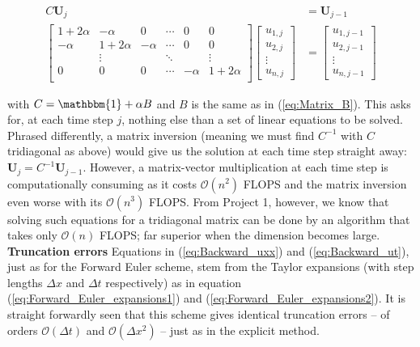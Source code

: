\documentclass[a4paper, 11pt, notitlepage,english]{article}
\newcommand{\id}{\mathbbm{1}}
\begin{document}
\begin{align}
C \boldsymbol{U}_j &= \boldsymbol{U}_{j-1} \\
\begin{bmatrix}
 1+2\alpha & -\alpha & 0 & \cdots & 0 & 0 \\
 -\alpha & 1+2\alpha & -\alpha & \cdots & 0 & 0 \\
  & \vdots & & \ddots & & \vdots \\
 0 & 0 & 0 & \cdots & -\alpha & 1+2\alpha \\
\end{bmatrix}
\begin{bmatrix}
u_{1,j} \\ u_{2,j} \\ \vdots \\ u_{n,j}
\end{bmatrix}
&=
\begin{bmatrix}
u_{1,j-1} \\ u_{2,j-1} \\ \vdots \\ u_{n,j-1}
\end{bmatrix}
\label{eq:Backwards_Euler_matrix}
\end{align}

with $C = \id + \alpha B$ and $B$ is the same as in (\ref{eq:Matrix_B}). This asks for, at each time step $j$, nothing else than a set of linear equations to be solved. Phrased differently, a matrix inversion (meaning we must find $C^{-1}$ with $C$ tridiagonal as above) would give us the solution at each time step straight away: $\boldsymbol{U}_j = C^{-1} \boldsymbol{U}_{j-1}$. However, a matrix-vector multiplication at each time step is computationally consuming as it costs $\mathcal{O}(n^2)$ FLOPS and the matrix inversion even worse with its $\mathcal{O}(n^3)$ FLOPS. From Project 1, however, we know that solving such equations for a tridiagonal matrix can be done by an algorithm that takes only $\mathcal{O}(n)$ FLOPS; far superior when the dimension becomes large. \\

\textbf{Truncation errors} \newline
Equations in (\ref{eq:Backward_uxx}) and (\ref{eq:Backward_ut}), just as for the Forward Euler scheme, stem from the Taylor expansions (with step lengths $\Delta x$ and $\Delta t$ respectively) as in equation (\ref{eq:Forward_Euler_expansions1}) and (\ref{eq:Forward_Euler_expansions2}). It is straight forwardly seen that this scheme gives identical truncation errors – of orders $\mathcal{O}(\Delta t)$ and $\mathcal{O}(\Delta x^2)$ – just as in the explicit method. \\
\end{document}
